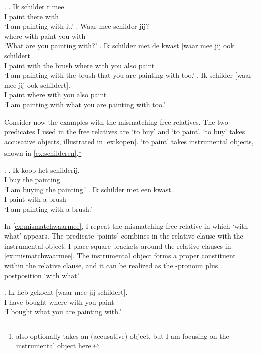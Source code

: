 \documentclass[11pt,a4paper]{article}
\begin{document}
\ex.
\ag. Ik schilder r mee.\\
 I paint there with\\
 `I am painting with it.'\label{ex:const1}
\bg. Waar mee schilder jij?\\
where with paint you with\\
 `What are you painting with?'\label{ex:const2}
\bg. Ik schilder met de kwast [waar mee jij ook schildert].\\
 I paint with the brush where with you also paint\\
 `I am painting with the brush that you are painting with too.'\label{ex:const3}
\bg. Ik schilder [waar mee jij ook schildert].\\
 I paint where with you also paint\\
 `I am painting with what you are painting with too.'\label{ex:const4}

Consider now the examples with the mismatching free relatives. The two predicates I used in the free relatives are  `to buy' and  `to paint'.  `to buy' takes accusative objects, illustrated in \ref{ex:kopen}.  `to paint' takes instrumental objects, shown in \ref{ex:schilderen}.\footnote{ also optionally takes an (accusative) object, but I am focusing on the instrumental object here.}

\ex.
\ag. Ik koop het schilderij.\\
 I buy the painting\\
 `I am buying the painting.'\label{ex:kopen}
\bg. Ik schilder met een kwast.\\
 I paint with a brush\\
 `I am painting with a brush.'\label{ex:schilderen}

In \ref{ex:mismatchwaarmee}, I repeat the mismatching free relative in which  `with what' appears. The predicate  `paints' combines in the relative clause with the instrumental object. I place square brackets around the relative clauses in \ref{ex:mismatchwaarmee}. The instrumental object forms a proper constituent within the relative clause, and it can be realized as the -pronoun plus postposition  `with what'.

\exg. Ik heb gekocht [waar mee jij schildert].\\
 I have bought where with you paint\\
 `I bought what you are painting with.'\label{ex:mismatchwaarmee}
\end{document}
